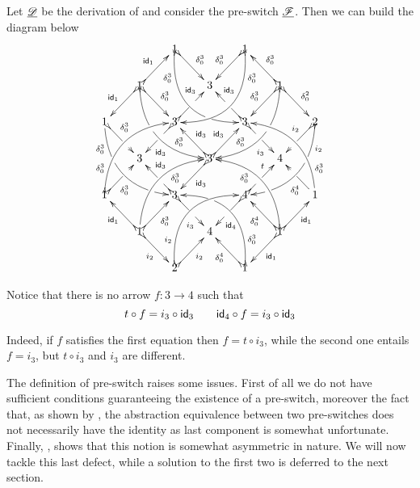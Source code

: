 \begin{example}\label{ex:abs2}
Let $\underline{\mathscr{D}}$ be the derivation of  and consider the pre-switch $\underline{\mathscr{F}}$. Then we can build the diagram below
	\[\xymatrix@C=20pt@R=20pt{&&1 \ar@{>->}@/_.9cm/[ddrr]_(.2){\delta^3_0}|(.72)\hole
	\ar@{>->}[dr]^{\delta^3_0}&& 1\ar@{>->}@/^.9cm/[ddll]^(.2){\delta^3_0}
	\ar@{>->}[dl]_{\delta^3_0}\\
	&1\ar@{>->}[dr]^{\delta^3_0}\ar@{>->}[dl]_{\id{1}}
	\ar@{>->}@/_.7cm/[ddrr]|(.38)\hole^(.7){\delta^3_0}\ar@{>->}[ur]^{\id{1}}&& 3 &&
	1
	\ar@{>->}@/^.7cm/[ddll]|(.38)\hole_(.7){\delta^3_0}\ar@{>->}[dl]_{\delta^3_0}\ar@{>->}[lu]_{\delta^3_0}
	\ar@{>->}[dr]^{\delta^2_0}\\
	1 \ar@/_.7cm/[ddrr]_(.2){\delta^3_0}|(.325)\hole|(.81)\hole
	\ar@{>->}[dr]^(.35){\delta^3_0}|(.6)\hole && 3
	\ar@{>->}[dl]|(.4)\hole^(.65){\id{3}}\ar@{>->}[ur]|(.5)\hole^(.7){\id{3} }&&3
	\ar@{>->}[dr]|(.4)\hole_(.65){i_3}
	\ar@{>->}[ul]|(.475)\hole_(.7){\id{3}}&&2\ar@{>->}@/^.7cm/[ddll]^(.2){i_2}|(.325)\hole|(.81)\hole\ar@{>->}[dl]_(.35){i_2}|(.6)\hole\\
	&3 &&3	\ar@{>->}[dl]^{\id{3}}\ar@{>->}[ur]^{\id{3}}\ar@{>->}[ul]_{\id{3}}&&4\\
	1	\ar@{>->}@/^.7cm/[uurr]^(.2){\delta^3_0} \ar@{>->}[ur]_(.35){\delta^3_0}|(.61)\hole && 3	\ar@{>->}[ul]|(.4)\hole_(.65){\id{3}}\ar@{>->}[dr]|(.5)\hole_(.65){i_3}	&&4\ar@{>->}[ur]|(.4)\hole^(.65){t} \ar@{>->}[dl]|(.5)\hole^(.65){\id{4}}	&& 1\ar[ul]^(.35){\delta^4_0}|(.61)\hole\ar@/_.7cm/[uull]_(.2){\delta^3_0}\\ 
	&1	\ar@{>->}[ur]_{\delta^3_0} \ar@{>->}[dr]_{i_2}	\ar@{>->}[ul]^{\id{1}}\ar@/^.7cm/[uurr]_(.65){\delta^3_0}&&4&& 1\ar@{>->}[ur]_{\id{1}} \ar@{>->}[ul]^{\delta^4_0} \ar@{>->}[dl]^{\id{1}} \ar@{>->}@/_.7cm/[uull]^(.65){\delta^3_0}\\&& 2	\ar@{>->}[ur]_{i_2}\ar@{>->}@/^.9cm/[uurr]^(.2){i_2}&& 1 \ar@{>->}[ul]^{\delta^4_0} \ar@{>->}@/_.9cm/[uull]_(.2){\delta^3_0} |(.72)\hole }\] 

Notice that there is no arrow $f\colon 3\to 4$ such that 
\[t\circ f=i_3\circ \mathsf{id}_{3} \qquad \mathsf{id}_{4}\circ f=i_3\circ \mathsf{id}_{3}\]

Indeed, if $f$ satisfies the first equation then $f=t\circ i_3$, while the second one entails $f=i_3$, but $t\circ i_3$ and $i_3$ are different.
\end{example}

The definition of pre-switch raises some issues. First of all we do not have sufficient conditions guaranteeing the existence of a pre-switch, moreover the fact that, as shown by , the abstraction equivalence between two pre-switches does not necessarily have the identity as last component is somewhat unfortunate. Finally, , shows that this notion  is somewhat asymmetric in nature.  We will now tackle this last defect, while a solution to the first two is deferred to the next section.

